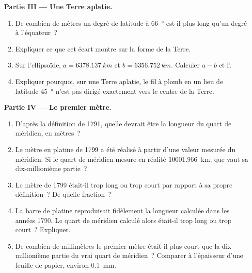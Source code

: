 \begin{problem}
\medskip
\noindent\textbf{Partie III --- Une Terre aplatie.}
\begin{enumerate}[resume]
  \item De combien de mètres un degré de latitude à \qty{66}{\degree}
        est-il plus long qu'un degré à l'équateur~?
  \item Expliquer ce que cet écart montre sur la forme de la Terre.
  \item Sur l'ellipsoïde, $a = \qty{6378.137}{km}$ et
        $b = \qty{6356.752}{km}$. Calculer $a - b$ et l'.
  \item Expliquer pourquoi, sur une Terre aplatie, le fil à plomb en un lieu
        de latitude \qty{45}{\degree} n'est pas dirigé exactement vers le
        centre de la Terre.
\end{enumerate}

\medskip
\noindent\textbf{Partie IV --- Le premier mètre.}
\begin{enumerate}[resume]
  \item D'après la définition de 1791, quelle devrait être la longueur du
        quart de méridien, en mètres~?
  \item Le mètre en platine de 1799 a été réalisé à partir d'une valeur
        mesurée du méridien. Si le quart de méridien mesure en réalité
        \qty{10001.966}{km}, que vaut sa dix-millionième partie~?
  \item Le mètre de 1799 était-il trop long ou trop court par rapport à sa
        propre définition~? De quelle fraction~?
  \item La barre de platine reproduisait fidèlement la longueur calculée
        dans les années 1790. Le quart de méridien calculé alors était-il
        trop long ou trop court~? Expliquer.
  \item De combien de millimètres le premier mètre était-il plus court que
        la dix-millionième partie du vrai quart de méridien~? Comparer à
        l'épaisseur d'une feuille de papier, environ \qty{0.1}{mm}.
\end{enumerate}
\end{problem}
